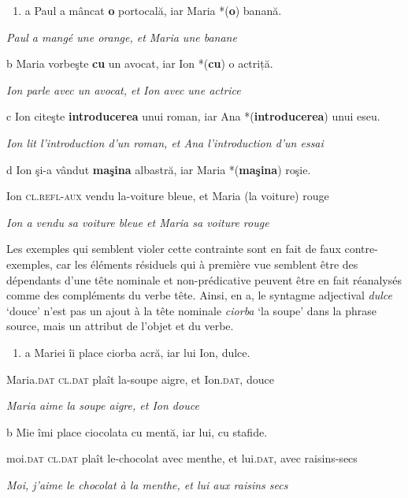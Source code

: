 \begin{enumerate}
\item \label{bkm:Ref289362271}a  Paul a mâncat \textbf{o} portocală, iar Maria *(\textbf{o}) banană.


\end{enumerate}
{\itshape
Paul a mangé une orange, et Maria une banane  } 

  b  Maria vorbeşte \textbf{cu} un avocat, iar Ion *(\textbf{cu}) o actriță.

{\itshape
Ion parle avec un avocat, et Ion avec une actrice      } 

  c  Ion citeşte \textbf{introducerea} unui roman, iar Ana *(\textbf{introducerea}) unui eseu.

{\itshape
Ion lit l'introduction d'un roman, et Ana l'introduction d'un essai    } 

  d  Ion şi-a vândut \textbf{maşina} albastră, iar Maria *(\textbf{maşina}) roşie.

    Ion \textsc{cl.refl-aux} vendu la-voiture bleue, et Maria (la voiture) rouge

{\itshape
Ion a vendu sa voiture bleue et Maria sa voiture rouge} 

Les exemples qui semblent violer cette contrainte sont en fait de faux contre-exemples, car les éléments résiduels qui à première vue semblent être des dépendants d'une tête nominale et non-prédicative peuvent être en fait réanalysés comme des compléments du verbe tête. Ainsi, en a, le syntagme adjectival \textit{dulce} `douce' n'est pas un ajout à la tête nominale \textit{ciorba} `la soupe' dans la phrase source, mais un attribut de l'objet et du verbe.


\begin{enumerate}
\item \label{bkm:Ref288742730}a  Mariei îi place ciorba acră, iar lui Ion, dulce.


\end{enumerate}
Maria.\textsc{dat cl.dat} plaît la-soupe aigre, et Ion.\textsc{dat,} douce

{\itshape
Maria aime la soupe aigre, et Ion douce      } 

  b  Mie îmi place ciocolata cu mentă, iar lui, cu stafide.

    moi\textsc{.dat} \textsc{cl.dat} plaît le-chocolat avec menthe, et lui\textsc{.dat,} avec raisins-secs

{\itshape
Moi, j'aime le chocolat à la menthe, et lui aux raisins secs}

